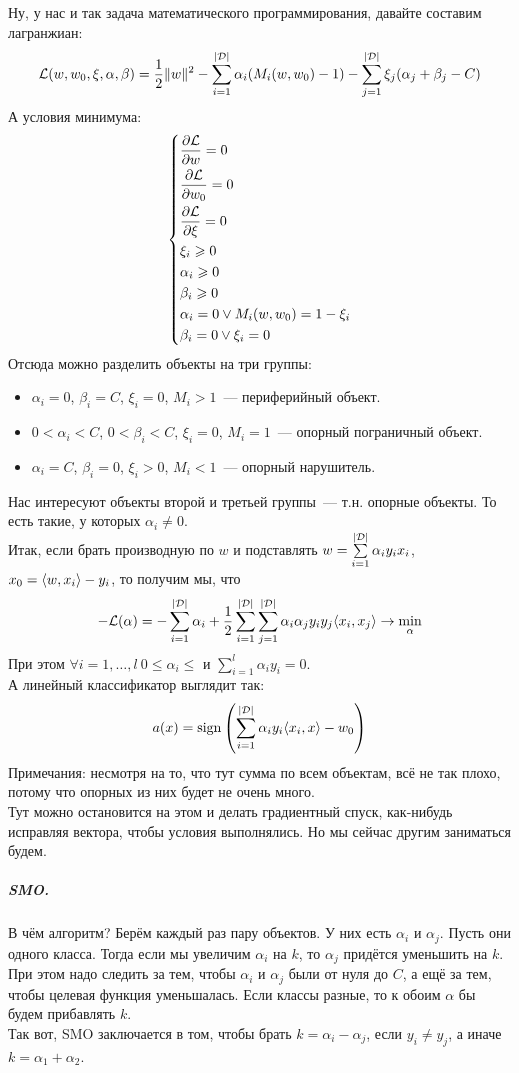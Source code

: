 \documentclass{article}
\begin{document}
    Ну, у нас и так задача математического программирования, давайте составим лагранжиан:
    \[
    {\mathcal{L}}(w,w_0,\xi,\alpha,\beta)=\frac12\|w\|^2-\sum\limits_{i=1}^{|{\mathcal{D}}|}\alpha_i(M_i(w,w_0)-1)-\sum\limits_{j=1}^{|{\mathcal{D}}|}\xi_j(\alpha_j+\beta_j-C)
    \]
    А условия минимума:
    \[
    \left\{\begin{aligned}
        &\frac{\partial{\mathcal{L}}}{\partial w}=0\\
        &\frac{\partial{\mathcal{L}}}{\partial w_0}=0\\
        &\frac{\partial{\mathcal{L}}}{\partial\xi}=0\\
        &\xi_i\geqslant0\\
        &\alpha_i\geqslant0\\
        &\beta_i\geqslant0\\
        &\alpha_i=0\lor M_i(w,w_0)=1-\xi_i\\
        &\beta_i=0\lor\xi_i=0\\
    \end{aligned}\right.
    \]
    Отсюда можно разделить объекты на три группы:
    \begin{itemize}
        \item $\alpha_i=0$, $\beta_i=C$, $\xi_i=0$, $M_i>1$~--- периферийный объект.
        \item $0<\alpha_i<C$, $0<\beta_i<C$, $\xi_i=0$, $M_i=1$~--- опорный пограничный объект.
        \item $\alpha_i=C$, $\beta_i=0$, $\xi_i>0$, $M_i<1$~--- опорный нарушитель.
    \end{itemize}
    Нас интересуют объекты второй и третьей группы~--- т.н. опорные объекты. То есть такие, у которых $\alpha_i\neq0$.\\
    Итак, если брать производную по $w$ и подставлять $w=\sum\limits_{i=1}^{|{\mathcal{D}}|}\alpha_iy_ix_i$, $x_0={\left\langle{w},{x_i}\right\rangle}-y_i$, то получим мы, что
    \[
    -{\mathcal{L}}(\alpha)=-\sum\limits_{i=1}^{|{\mathcal{D}}|}\alpha_i+\frac12\sum\limits_{i=1}^{|{\mathcal{D}}|}\sum\limits_{j=1}^{|{\mathcal{D}}|}\alpha_i\alpha_jy_iy_j{\left\langle{x_i},{x_j}\right\rangle}\to\min_\alpha
    \]
    При этом $\forall i=1,\ldots,l~0\leqslant\alpha_i\leqslant$ и $\sum\limits_{i=1}^{l}\alpha_iy_i=0$.\\
    А линейный классификатор выглядит так:
    \[
    a(x)=\operatorname{sign}\left(\sum\limits_{i=1}^{|{\mathcal{D}}|}\alpha_iy_i{\left\langle{x_i},{x}\right\rangle}-w_0\right)
    \]
    Примечания: несмотря на то, что тут сумма по всем объектам, всё не так плохо, потому что опорных из них будет не очень много.\\
    Тут можно остановится на этом и делать градиентный спуск, как-нибудь исправляя вектора, чтобы условия выполнялись. Но мы сейчас другим заниматься будем.
    \subparagraph{SMO.}
    В чём алгоритм? Берём каждый раз пару объектов. У них есть $\alpha_i$ и $\alpha_j$. Пусть они одного класса. Тогда если мы увеличим $\alpha_i$ на $k$, то $\alpha_j$ придётся уменьшить на $k$. При этом надо следить за тем, чтобы $\alpha_i$ и $\alpha_j$ были от нуля до $C$, а ещё за тем, чтобы целевая функция уменьшалась. Если классы разные, то к обоим $\alpha$ бы будем прибавлять $k$.\\
    Так вот, SMO заключается в том, чтобы брать $k=\alpha_i-\alpha_j$, если $y_i\neq y_j$, а иначе $k=\alpha_1+\alpha_2$.
\end{document}
